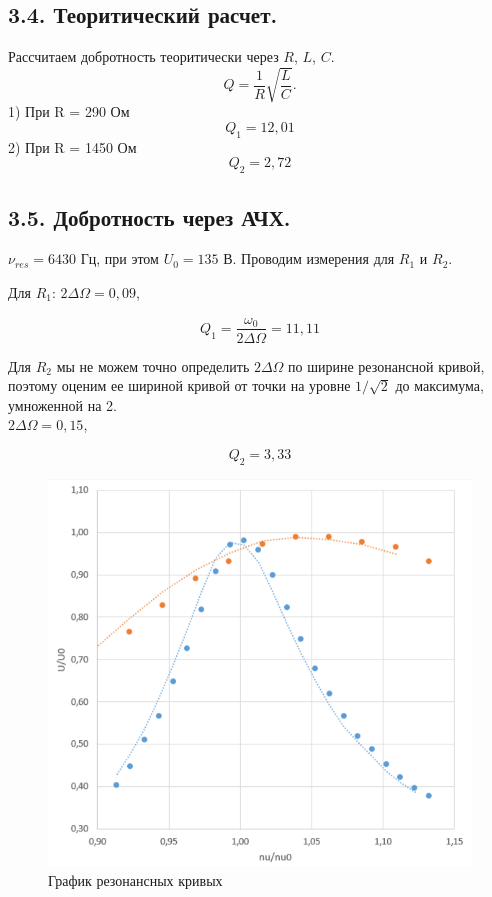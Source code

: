 \documentclass[a4paper,12pt]{article}
\begin{document}
\subsection*{3.4. Теоритический расчет.} 
Рассчитаем добротность теоритически через $R$, $L$, $C$.
$$
Q = \dfrac{1}{R}\sqrt{\dfrac{L}{C}}.
$$
1) При R = 290 Ом 
$$
Q_1 = 12,01
$$
2) При R = 1450 Ом 
$$
Q_2 = 2,72
$$

\subsection*{3.5. Добротность через АЧХ.}

$\nu_{res} = 6430$ Гц, при этом $U_0 = 135$ В. Проводим измерения для $R_1$ и $R_2$.

Для $R_1$: $2\Delta\Omega = 0,09$, 

$$
Q_1 = \frac{\omega_0}{2\Delta\Omega}=11,11
$$

Для $R_2$ мы не можем точно определить $2\Delta\Omega$ по ширине резонансной кривой, поэтому оценим ее шириной кривой от точки на уровне $1/\sqrt{2}$ до максимума, умноженной на 2.\\
$2\Delta\Omega = 0,15$, 

$$
Q_2 = 3,33
$$

\begin{figure}[h]
    \includegraphics[scale=0.6]{3.png}
    \centering
    \caption{График резонансных кривых}
\end{figure}
\end{document}
